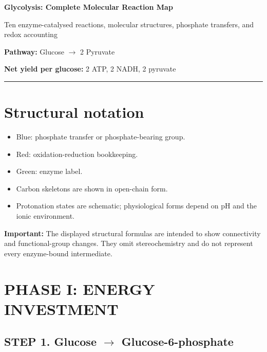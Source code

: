 \documentclass[10pt,a4paper,landscape]{article}
\begin{document}
\begin{center}
{\LARGE\bfseries Glycolysis: Complete Molecular Reaction Map}

\vspace{2mm}

{\large Ten enzyme-catalysed reactions, molecular structures,
phosphate transfers, and redox accounting}

\vspace{2mm}

\textbf{Pathway:}
Glucose $\rightarrow$ 2 Pyruvate

\textbf{Net yield per glucose:}
2 ATP, 2 NADH, 2 pyruvate
\end{center}

\hrule
\vspace{3mm}

\section*{Structural notation}

\begin{itemize}
  \item \textcolor{phos}{Blue}: phosphate transfer or phosphate-bearing group.
  \item \textcolor{redox}{Red}: oxidation-reduction bookkeeping.
  \item \textcolor{enz}{Green}: enzyme label.
  \item Carbon skeletons are shown in open-chain form.
  \item Protonation states are schematic; physiological forms depend
  on pH and the ionic environment.
\end{itemize}

\textbf{Important:} The displayed structural formulas are intended
to show connectivity and functional-group changes. They omit
stereochemistry and do not represent every enzyme-bound intermediate.

\section*{PHASE I: ENERGY INVESTMENT}

\subsection*{STEP 1. Glucose $\rightarrow$ Glucose-6-phosphate}
\end{document}
